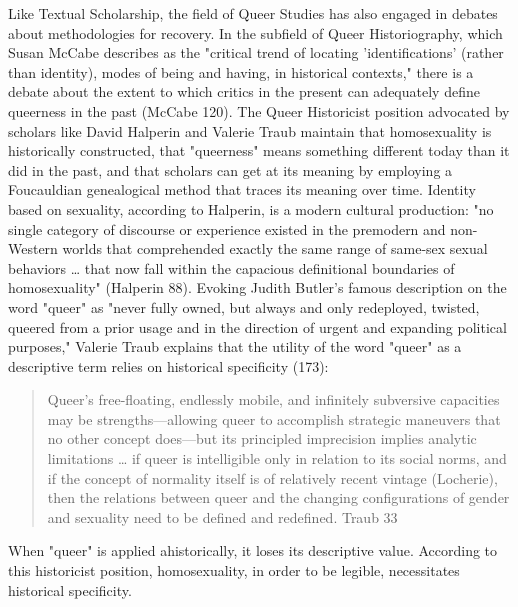 \documentclass[11pt]{article}
\begin{document}
Like Textual Scholarship, the field of Queer Studies has also engaged
in debates about methodologies for recovery. In the subfield of Queer
Historiography, which Susan McCabe describes as the "critical trend of
locating 'identifications' (rather than identity), modes of being and
having, in historical contexts," there is a debate about the extent to
which critics in the present can adequately define queerness in the
past (McCabe 120). The Queer Historicist position advocated by
scholars like David Halperin and Valerie Traub maintain that
homosexuality is historically constructed, that "queerness" means
something different today than it did in the past, and that scholars
can get at its meaning by employing a Foucauldian genealogical method
that traces its meaning over time. Identity based on sexuality,
according to Halperin, is a modern cultural production: "no single
category of discourse or experience existed in the premodern and
non-Western worlds that comprehended exactly the same range of
same-sex sexual behaviors \ldots{} that now fall within the capacious
definitional boundaries of homosexuality" (Halperin 88). Evoking
Judith Butler's famous description on the word "queer" as "never fully
owned, but always and only redeployed, twisted, queered from a prior
usage and in the direction of urgent and expanding political
purposes," Valerie Traub explains that the utility of the word "queer"
as a descriptive term relies on historical specificity (173):
\begin{quote}
Queer's free-floating, endlessly mobile, and infinitely subversive
capacities may be strengths---allowing queer to accomplish strategic
maneuvers that no other concept does---but its principled imprecision
implies analytic limitations \ldots{} if queer is intelligible only in
relation to its social norms, and if the concept of normality itself
is of relatively recent vintage (Locherie), then the relations between
queer and the changing configurations of gender and sexuality need to
be defined and redefined. Traub 33
\end{quote}
When "queer" is applied ahistorically, it loses its descriptive
value. According to this historicist position, homosexuality, in order
to be legible, necessitates historical specificity.
\end{document}
